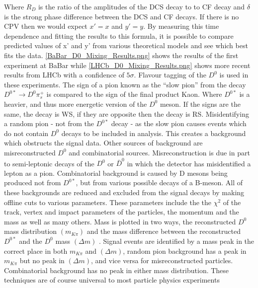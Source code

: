 \noindent Where $R_{D}$ is the ratio of the amplitudes of the DCS decay to to CF decay and $\delta$ is the strong phase difference between the DCS and CF decays. If there is no CPV then we would expect $x' = x$ and $y' = y$. By measuring this time dependence and fitting the results to this formula, it is possible to compare predicted values of x' and y' from various theoretical models and see which best fits the data. \cref{BaBar_D0_Mixing_Results.png} shows the results of the first experiment at BaBar while \cref{LHCb_D0_Mixing_Results.png} shows more recent results from LHCb with a confidence of $5 \sigma$. Flavour tagging of the $D^{0}$ is used in these experiments. The sign of a pion known as the ``slow pion'' from the decay $D^{0*} \rightarrow D^{0} \pi^{+}_{s}$ is compared to the sign of the final product Kaon. Where $D^{0*}$ is a heavier, and thus more energetic version of the $D^{0}$ meson. If the signs are the same, the decay is WS, if they are opposite then the decay is RS. Misidentifying a random pion - not from the $D^{0*}$ decay - as the slow pion causes events which do not contain $D^{0}$ decays to be included in analysis. This creates a background which obstructs the signal data. Other sources of background are misreconstructed $D^{0}$ and combinatorial sources. Misreconstruction is due in part to semi-leptonic decays of the $D^{0}$ or $\bar{D}^{0}$ in which the detector has misidentified a lepton as a pion. Combinatorial background is caused by D mesons being produced not from $D^{0*}$, but from various possible decays of a B-meson. All of these backgrounds are reduced and excluded from the signal decays by making offline cuts to various parameters. These parameters include the the $\chi^{2}$ of the track, vertex and impact parameters of the particles, the momentum and the mass as well as many others. Mass is plotted in two ways, the reconstructed $D^{0}$ mass distribution $(m_{K \pi})$ and the mass difference between the reconstructed $D^{0*}$ and the $D^{0}$ mass $(\Delta m)$ \cite{Kevin}. Signal events are identified by a mass peak in the correct place in both $m_{K \pi}$ and $(\Delta m)$, random pion background has a peak in $m_{K \pi}$ but no peak in $(\Delta m)$, and vice versa for misreconstructed particles. Combinatorial background has no peak in either mass distribution. These techniques are of course universal to most particle physics experiments 


